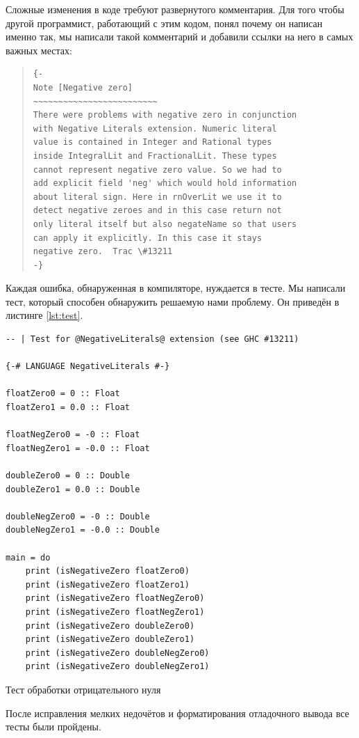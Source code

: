 Сложные изменения в коде требуют развернутого комментария. Для того чтобы
другой программист, работающий с этим кодом, понял почему он написан именно
так, мы написали такой комментарий и добавили ссылки на него в самых важных
местах:

\begin{quote}
\begin{verbatim}
{-
Note [Negative zero]
~~~~~~~~~~~~~~~~~~~~~~~~~
There were problems with negative zero in conjunction
with Negative Literals extension. Numeric literal
value is contained in Integer and Rational types
inside IntegralLit and FractionalLit. These types
cannot represent negative zero value. So we had to
add explicit field 'neg' which would hold information
about literal sign. Here in rnOverLit we use it to
detect negative zeroes and in this case return not
only literal itself but also negateName so that users
can apply it explicitly. In this case it stays
negative zero.  Trac \#13211
-}
\end{verbatim}
\end{quote}

Каждая ошибка, обнаруженная в компиляторе, нуждается в тесте. Мы написали
тест, который способен обнаружить решаемую нами проблему. Он приведён в
листинге \ref{lst:test}.

\begin{ListingEnv}[H]
\begin{lstlisting}
-- | Test for @NegativeLiterals@ extension (see GHC #13211)

{-# LANGUAGE NegativeLiterals #-}

floatZero0 = 0 :: Float
floatZero1 = 0.0 :: Float

floatNegZero0 = -0 :: Float
floatNegZero1 = -0.0 :: Float

doubleZero0 = 0 :: Double
doubleZero1 = 0.0 :: Double

doubleNegZero0 = -0 :: Double
doubleNegZero1 = -0.0 :: Double

main = do
    print (isNegativeZero floatZero0)
    print (isNegativeZero floatZero1)
    print (isNegativeZero floatNegZero0)
    print (isNegativeZero floatNegZero1)
    print (isNegativeZero doubleZero0)
    print (isNegativeZero doubleZero1)
    print (isNegativeZero doubleNegZero0)
    print (isNegativeZero doubleNegZero1)
\end{lstlisting}
\caption{Тест обработки отрицательного нуля}
\label{lst:test}
\end{ListingEnv}

После исправления мелких недочётов и форматирования отладочного вывода все
тесты были пройдены.


